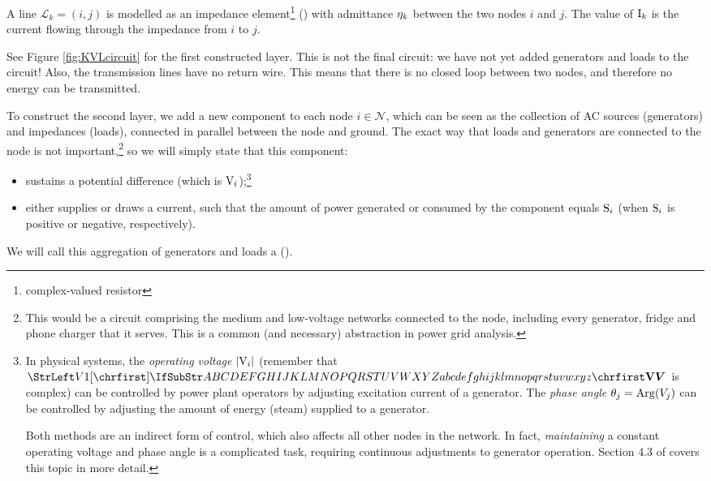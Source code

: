 \documentclass[main.tex]{subfiles}
\begin{document}
A line $\mathcal{L}_k=(i,j)$ is modelled as an impedance element\footnote{complex-valued resistor} (\inlineres) with admittance ${\mathrm{\eta}}_k$ between the two nodes $i$ and $j$. The value of ${\mathrm{I}}_k$ is the current flowing through the impedance from $i$ to $j$.

See Figure \ref{fig:KVLcircuit} for the first constructed layer. This is not the final circuit: we have not yet added generators and loads to the circuit! Also, the transmission lines have no return wire. This means that there is no closed loop between two nodes, and therefore no energy can be transmitted.

To construct the second layer, we add a new component to each node $i \in \mathcal{N}$, which can be seen as the collection of AC sources (generators) and impedances (loads), connected in parallel between the node and ground. The exact way that loads and generators are connected to the node is not important,\footnote{This would be a circuit comprising the medium and low-voltage networks connected to the node, including every generator, fridge and phone charger that it serves. This is a common (and necessary) abstraction in power grid analysis.} so we will simply state that this component:
\begin{itemize}
    \item sustains a potential difference (which is ${\mathrm{V}}_i$);\footnote{In physical systems, the \emph{operating voltage} $|{\mathrm{V}}_i|$ (remember that $\mat{V}$ is complex) can be controlled by power plant operators by adjusting excitation current of a generator. The \emph{phase angle} $\theta_j=\operatorname{Arg}(V_j)$ can be controlled by adjusting the amount of energy (steam) supplied to a generator.

    Both methods are an indirect form of control,
	which also affects    
    all other nodes in the network. In fact, \emph{maintaining} a constant operating voltage and phase angle is a complicated task, requiring continuous adjustments to generator operation. Section 4.3 of \cite{VonMeier2006} covers this topic in more detail.}
    \item either supplies or draws a current, such that the amount of power generated or consumed by the component equals ${\mathrm{S}}_i$ (when ${\mathrm{S}}_i$ is positive or negative, respectively).
\end{itemize}
We will call this aggregation of generators and loads a  (\inlineac).
\end{document}
